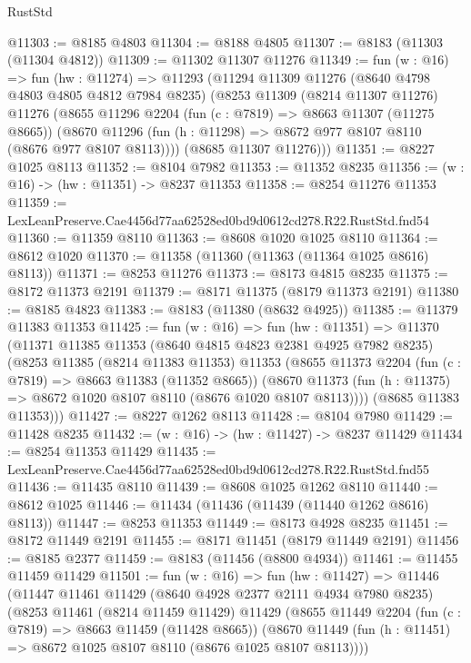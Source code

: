 \begin{lexlean}{RustStd}
\begin{coremodule}
@11303 := @8185 @4803
@11304 := @8188 @4805
@11307 := @8183 (@11303 (@11304 @4812))
@11309 := @11302 @11307 @11276
@11349 := fun (w : @16) =>
  fun (hw : @11274) =>
  @11293
    (@11294
      @11309
      @11276
      (@8640 @4798 @4803 @4805 @4812 @7984 @8235)
      (@8253
        @11309
        (@8214 @11307 @11276)
        @11276
        (@8655
          @11296
          @2204
          (fun (c : @7819) => @8663 @11307 (@11275 @8665))
          (@8670 @11296 (fun (h : @11298) => @8672 @977 @8107 @8110 (@8676 @977 @8107 @8113))))
        (@8685 @11307 @11276)))
@11351 := @8227 @1025 @8113
@11352 := @8104 @7982
@11353 := @11352 @8235
@11356 := (w : @16) -> (hw : @11351) -> @8237 @11353
@11358 := @8254 @11276 @11353
@11359 := LexLeanPreserve.Cae4456d77aa62528ed0bd9d0612cd278.R22.RustStd.fnd54
@11360 := @11359 @8110
@11363 := @8608 @1020 @1025 @8110
@11364 := @8612 @1020
@11370 := @11358 (@11360 (@11363 (@11364 @1025 @8616) @8113))
@11371 := @8253 @11276
@11373 := @8173 @4815 @8235
@11375 := @8172 @11373 @2191
@11379 := @8171 @11375 (@8179 @11373 @2191)
@11380 := @8185 @4823
@11383 := @8183 (@11380 (@8632 @4925))
@11385 := @11379 @11383 @11353
@11425 := fun (w : @16) =>
  fun (hw : @11351) =>
  @11370
    (@11371
      @11385
      @11353
      (@8640 @4815 @4823 @2381 @4925 @7982 @8235)
      (@8253
        @11385
        (@8214 @11383 @11353)
        @11353
        (@8655
          @11373
          @2204
          (fun (c : @7819) => @8663 @11383 (@11352 @8665))
          (@8670 @11373 (fun (h : @11375) => @8672 @1020 @8107 @8110 (@8676 @1020 @8107 @8113))))
        (@8685 @11383 @11353)))
@11427 := @8227 @1262 @8113
@11428 := @8104 @7980
@11429 := @11428 @8235
@11432 := (w : @16) -> (hw : @11427) -> @8237 @11429
@11434 := @8254 @11353 @11429
@11435 := LexLeanPreserve.Cae4456d77aa62528ed0bd9d0612cd278.R22.RustStd.fnd55
@11436 := @11435 @8110
@11439 := @8608 @1025 @1262 @8110
@11440 := @8612 @1025
@11446 := @11434 (@11436 (@11439 (@11440 @1262 @8616) @8113))
@11447 := @8253 @11353
@11449 := @8173 @4928 @8235
@11451 := @8172 @11449 @2191
@11455 := @8171 @11451 (@8179 @11449 @2191)
@11456 := @8185 @2377
@11459 := @8183 (@11456 (@8800 @4934))
@11461 := @11455 @11459 @11429
@11501 := fun (w : @16) =>
  fun (hw : @11427) =>
  @11446
    (@11447
      @11461
      @11429
      (@8640 @4928 @2377 @2111 @4934 @7980 @8235)
      (@8253
        @11461
        (@8214 @11459 @11429)
        @11429
        (@8655
          @11449
          @2204
          (fun (c : @7819) => @8663 @11459 (@11428 @8665))
          (@8670 @11449 (fun (h : @11451) => @8672 @1025 @8107 @8110 (@8676 @1025 @8107 @8113))))

\end{coremodule}
\end{lexlean}
